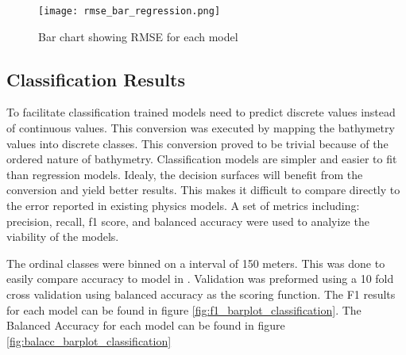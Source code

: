 \begin{figure}[h]
    \centering
    \texttt{[image: rmse\_bar\_regression.png]} 
    \caption{Bar chart showing RMSE for each model}
    \label{fig:rmse_barplot_regression}
\end{figure}


\subsection{Classification Results}
\setlength{\parindent}{10ex}
To facilitate classification trained models need to predict discrete values instead of continuous values.
This conversion was executed by mapping the bathymetry values into discrete classes.
This conversion proved to be trivial because of the ordered nature of bathymetry.
Classification models are simpler and easier to fit than regression models.
Idealy, the decision surfaces will benefit from the conversion and yield better results.
This makes it difficult to compare directly to the error reported in existing physics models.
A set of metrics including: precision, recall, f1 score, and balanced accuracy were used to analyize the viability of the models.

\par
The ordinal classes were binned on a interval of 150 meters.
This was done to easily compare accuracy to model in \cite{jena2012prediction}.
Validation was preformed using a 10 fold cross validation using balanced accuracy as the scoring function.
The F1 results for each model can be found in figure \ref{fig:f1_barplot_classification}.
The Balanced Accuracy for each model can be found in figure \ref{fig:balacc_barplot_classification}


